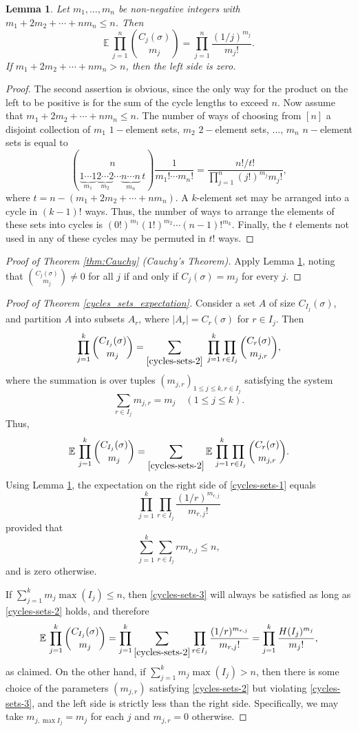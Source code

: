 \documentclass[10pt]{article}
\newtheorem{lem}[thm]{Lemma}
\newcommand{\E}{{\mathbb E}\,}
\newcommand{\be}{\begin{equation}}
\newcommand{\ee}{\end{equation}}
\renewcommand{\le}{\leqslant}
\renewcommand{\(}{\left(}
\renewcommand{\)}{\right)}
\begin{document}
\begin{lem}\label{cycles}
Let $m_1,\ldots,m_n$ be non-negative integers with $m_1+2m_2+\cdots+nm_n\le n$.  Then
 \[
\E \prod_{j=1}^n \binom{C_j(\sigma)}{m_j} = \prod_{j=1}^n \frac{(1/j)^{m_j}}{m_j!}.
\]
If  $m_1+2m_2+\cdots+nm_n > n$, then the left side is zero.
\end{lem}
\begin{proof}
The second assertion is obvious, since the only way for the product on the left to be positive is for the sum of the cycle lengths to exceed $n$. Now assume that
$m_1+2m_2+\cdots+nm_n\le n$. 
 The number of ways of choosing from $[n]$ a disjoint collection 
  of $m_1$ $1-$element sets, $m_2$  $2-$element sets,
$\ldots$, $m_n$ $n-$element sets is equal to
\[
 \binom{n}{\underbrace{1 \cdots 1}_{m_1} \underbrace{2 \cdots 2}_{m_2} \cdots \underbrace{n\cdots n}_{m_n} \, t} 
 \frac{1}{m_1! \cdots m_n!} = \frac{n!/t!}{\prod_{j=1}^n (j!)^{m_j} m_j!},
 \]
where $t=n-(m_1+2m_2+\cdots+nm_n)$.
A $k$-element set may be arranged into a cycle in $(k-1)!$ ways.
Thus, 
the number of ways to arrange the elements of these sets into cycles is $(0!)^{m_1} (1!)^{m_2} \cdots (n-1)!^{m_k}$.
Finally, the $t$ elements not used in any of these cycles may be permuted in $t!$ ways.
\end{proof}
\begin{proof}[Proof of Theorem \ref{thm:Cauchy} (Cauchy's Theorem)] 
Apply Lemma \ref{cycles}, noting that $\binom{C_j(\sigma)}{m_j}\ne 0$
for all $j$ if and only if $C_j(\sigma)=m_j$ for every $j$.
\end{proof}
\begin{proof}[Proof of Theorem \ref{cycles_sets_expectation}]
Consider a set $A$ of size $C_{I_j}(\sigma)$,
and partition $A$ into subsets $A_r$, where
$|A_r|=C_r(\sigma)$ for $r\in I_j$.  Then
\[
\prod_{j=1}^k\binom{C_{I_j}(\sigma)}{m_j} = \sum_{\eqref{cycles-sets-2}}\;
\prod_{j=1}^k \prod_{r\in I_j} \binom{C_r(\sigma)}{m_{j,r}},
\]
where the summation is over tuples $(m_{j,r})_{1\le j\le k,r\in I_j}$
satisfying the system
\be\label{cycles-sets-2}
\sum_{r\in I_j} m_{j,r} = m_j \quad (1\le j\le k). 
\ee
Thus,
\be\label{cycles-sets-1}
\E \prod_{j=1}^k \binom{C_{I_j}(\sigma)}{m_j} = \sum_{\eqref{cycles-sets-2}} \E \prod_{j=1}^k \prod_{r\in I_j} \binom{C_r(\sigma)}{m_{j,r}}.
\ee
Using Lemma \ref{cycles}, the expectation on the right side of \eqref{cycles-sets-1} equals
\[
\prod_{j=1}^k \prod_{r\in I_j} \frac{(1/r)^{m_{r,j}}}{m_{r,j}!}
\]
provided that
\be\label{cycles-sets-3}
\sum_{j=1}^k \sum_{r\in I_j} r m_{r,j} \le n, 
\ee
and is zero otherwise.  

If $\sum_{j=1}^k m_j \max(I_j)\le n$, then \eqref{cycles-sets-3} will always be satisfied
as long as \eqref{cycles-sets-2} holds,
and therefore
\[
\E \prod_{j=1}^k \binom{C_{I_j}(\sigma)}{m_j} =
 \prod_{j=1}^k \sum_{\eqref{cycles-sets-2}} \prod_{r\in I_j} \frac{(1/r)^{m_{r,j}}}{m_{r,j}!} = \prod_{j=1}^k \frac{H(I_j)^{m_j}}{m_j!},
\]
as claimed.  On the other hand, if
 $\sum_{j=1}^k m_j \max(I_j) > n$, then there is some choice of the parameters
$(m_{j,r})$ satisfying \eqref{cycles-sets-2} but violating \eqref{cycles-sets-3}, 
and the left side is strictly less than the right side.
Specifically, we may take $m_{j,\max I_j}=m_j$ for each $j$
and $m_{j,r}=0$ otherwise. 
\end{proof}
\end{document}
